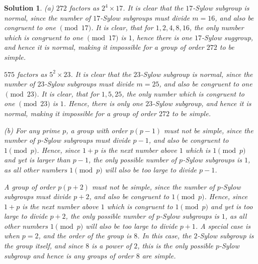 \documentclass[12pt]{article}
\theoremstyle{moo}
\newtheorem*{sol}{Solution}
\begin{document}
\begin{sol}
(a)
$272$ factors as $2^4 \times 17$. It is clear that the $17$-Sylow subgroup is normal, since the number of $17$-Sylow subgroups must divide $m = 16$, and also be congruent to one $\pmod{17}$. It is clear, that for $1,2,4,8,16$, the only number which is congruent to one $\pmod{17}$ is $1$, hence there is one $17$-Sylow suggroup, and hence it is normal, making it impossible for a group of order $272$ to be simple.

$575$ factors as $5^2 \times 23$. It is clear that the $23$-Sylow subgroup is normal, since the number of $23$-Sylow subgroups must divide $m = 25$, and also be congruent to one $\pmod{23}$. It is clear, that for $1,5,25$, the only number which is congruent to one $\pmod{23}$ is $1$. Hence, there is only one $23$-Sylow subgroup, and hence it is normal, making it impossible for a group of order $272$ to be simple.

(b) For any prime $p$, a group with order $p(p-1)$ must not be simple, since the number of $p$-Sylow subgroups must divide $p-1$, and also be congruent to $1 \pmod{p}$. Hence, since $1+p$ is the next number above $1$ which is $1 \pmod{p}$ and yet is larger than $p-1$, the only possible number of $p$-Sylow subgroups is $1$, as all other numbers $1 \pmod{p}$ will also be too large to divide $p-1$.

A group of order $p(p+2)$ must not be simple, since the number of $p$-Sylow subgroups must divide $p+2$, and also be congruent to $1 \pmod{p}$. Hence, since $1+p$ is the next number above $1$ which is congruent to $1 \pmod{p}$ and yet is too large to divide $p+2$, the only possible number of $p$-Sylow subgroups is $1$, as all other numbers $1 \pmod{p}$ will also be too large to divide $p+1$. A special case is when $p=2$, and the order of the group is $8$. In this case, the $2$-Sylow subgroup is the group itself, and since $8$ is a power of $2$, this is the only possible $p$-Sylow subgroup and hence is any groups of order $8$ are simple.
\end{sol}
\end{document}
